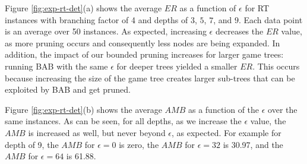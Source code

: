 \documentclass[letterpaper]{article} %
\newcommand{\amb}{\textit{AMB}}
\newcommand{\er}{\textit{ER}}
\begin{document}




Figure \ref{fig:exp-rt-det}(a) shows the average $\er$ as a function of $\epsilon$ for RT instances with branching factor of 4 and depths of $3$, $5$, $7$, and $9$.
Each data point is an average over 50 instances. 
As expected, increasing $\epsilon$ decreases the $\er$ value, as more pruning occurs and consequently less nodes are being expanded.
In addition, the impact of our bounded pruning increases for larger game trees: running BAB with the same $\epsilon$ for deeper trees yielded a smaller $\er$.
This occurs because increasing the size of the game tree creates larger sub-trees that can be exploited by BAB and get pruned. 

Figure \ref{fig:exp-rt-det}(b) shows the average $\amb$ as a function of the $\epsilon$ over the same instances. As can be seen, for all depths, as we increase the $\epsilon$ value, the $\amb$ is increased as well, but never beyond $\epsilon$, as expected. For example for depth of 9, the $\amb$ for $\epsilon=0$ is zero, the $\amb$ for $\epsilon=32$ is 30.97, and the $\amb$ for $\epsilon=64$ is 61.88. 
\end{document}
